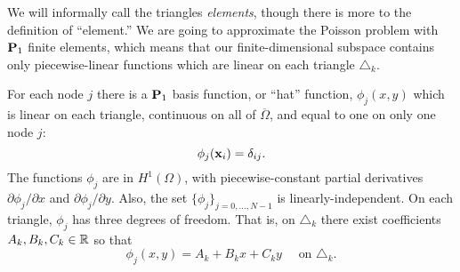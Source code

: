 We will informally call the triangles \emph{elements}, though there is more to the definition of ``element.''  We are going to approximate the Poisson problem with $\mathbf{P}_1$ finite elements, which means that our finite-dimensional subspace contains only piecewise-linear functions which are linear on each triangle $\triangle_k$.

For each node $j$ there is a $\mathbf{P}_1$ basis function, or ``hat'' function, $\phi_j(x,y)$ which is linear on each triangle, continuous on all of $\overline{\Omega}$, and equal to one on only one node $j$:%
\begin{equation*}
\phi_j(\mathbf{x}_i) = \delta_{ij}.
\end{equation*}
The functions $\phi_j$ are in $H^1(\Omega)$, with piecewise-constant partial derivatives $\partial\phi_j/\partial x$ and $\partial\phi_j/\partial y$.  Also, the set $\{\phi_j\}_{j=0,\dots,N-1}$ is linearly-independent.  On each triangle, $\phi_j$ has three degrees of freedom.  That is, on $\triangle_k$ there exist coefficients $A_k,B_k,C_k\in\mathbb{R}$ so that
\begin{equation*}
\phi_j(x,y) = A_k + B_k x + C_k y \quad \text{ on } \triangle_k.
\end{equation*}

